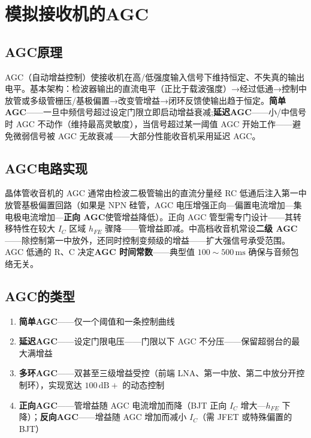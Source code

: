 \documentclass[12pt,UTF8]{ctexbook}
\begin{document}
\section{模拟接收机的AGC}
\label{sec:analog_agc}

\subsection{AGC原理}

AGC（自动增益控制）使接收机在高/低强度输入信号下维持恒定、不失真的输出电平。基本架构：检波器输出的直流电平（正比于载波强度）→经过低通→控制中放管或多级管栅压/基极偏置→改变管增益→闭环反馈使输出趋于恒定。\textbf{简单AGC}——一旦中频信号超过设定门限立即启动增益衰减;\textbf{延迟AGC}——小/中信号时 AGC 不动作（维持最高灵敏度），当信号超过某一阈值 AGC 开始工作——避免微弱信号被 AGC 无故衰减——大部分性能收音机采用延迟 AGC。

\subsection{AGC电路实现}

晶体管收音机的 AGC 通常由检波二极管输出的直流分量经 RC 低通后注入第一中放管基极偏置回路（如果是 NPN 硅管，AGC 电压增强正向—偏置电流增加—集电极电流增加—\textbf{正向 AGC}使管增益降低）。正向 AGC 管型需专门设计——其转移特性在较大 $I_C$ 区域 $h_{FE}$ 骤降——管增益即减。中高档收音机常设\textbf{二级 AGC}——除控制第一中放外，还同时控制变频级的增益——扩大强信号承受范围。AGC 低通的 R、C 决定\textbf{AGC 时间常数}——典型值 $100\sim500\,\mathrm{ms}$ 确保与音频包络无关。

\subsection{AGC的类型}


\begin{enumerate}
\item \textbf{简单AGC}——仅一个阈值和一条控制曲线
\item \textbf{延迟AGC}——设定门限电压——门限以下 AGC 不分压——保留超弱台的最大满增益
\item \textbf{多环AGC}——双甚至三级增益受控（前端 LNA、第一中放、第二中放分开控制环），实现宽达 $100\,\mathrm{dB}+$ 的动态控制
\item \textbf{正向AGC}——管增益随 AGC 电流增加而降（BJT 正向 $I_C$ 增大—$h_{FE}$ 下降）；\textbf{反向AGC}——增益随 AGC 增加而减小 $I_C$（需 JFET 或特殊偏置的 BJT）
\end{enumerate}
\end{document}
